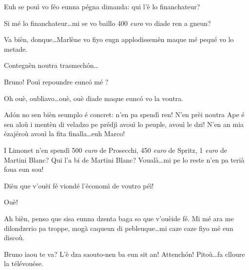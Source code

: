 \begin{drama}
\Brunospeaks Euh se pouì vo féo eunna pégna dimanda: qui l'è lo financhateur?


\Dallasspeaks{} Si mé lo financhateur\ldots mi se vo baillo  400 \textit{euro} vo diade ren a gneun?


\Brunospeaks Va bièn, donque\ldots Marlène vo fiyo eugn applodissemèn ma\-que mé pequé vo lo metade.


\Brunospeaks Contegnèn noutra trasmech\'on\ldots

\Jordyspeaks Bruno!  Pouì repoundre eunc\'o mé ?

\Brunospeaks  Oh ouè, oubliavo\ldots ouè, ouè diade maque eunc\'o vo la voutra.

\Jordyspeaks  Ad\'on no sen bièn seumplo é concret: n'en pa spendì ren! N'en prèi noutra Ape é sen aloù i mentèn di veladzo pe prédjì avouì lo peuple, avouì le dzi! N'en an mia ézajéroù avouì la fita finalla\ldots euh Marco!


\Jordyspeaks I Limonet n'en spendì 500 \textit{euro} de Prosecchi, 450 \textit{euro} de Spritz, 1 \textit{euro} de Martini Blanc?  Qui l'a bi de Martini Blanc? Voualà\ldots mi pe lo reste n'en pa terià foua eun sou!

\Brunospeaks Dièn que v'ouèi fé viondé l'économì de voutro péì!

\Jordyspeaks Ouè!

\Brunospeaks Ah bièn, penso que sisa eunna dzenta baga so que v'ou\-è\-i\-de fé.  Mi mé ara me dilondzerio pa troppe, mogà caqueun di pebleuque\ldots mi caze caze fiyo mé eun discoù.

\scene[-- Votade!]


\Noteospeaks Bruno iaou te va? L'è dza saouto-nen ba eun sit an! Attench\'on! Pitoù\ldots fa clloure la télévouése.


\end{drama}
